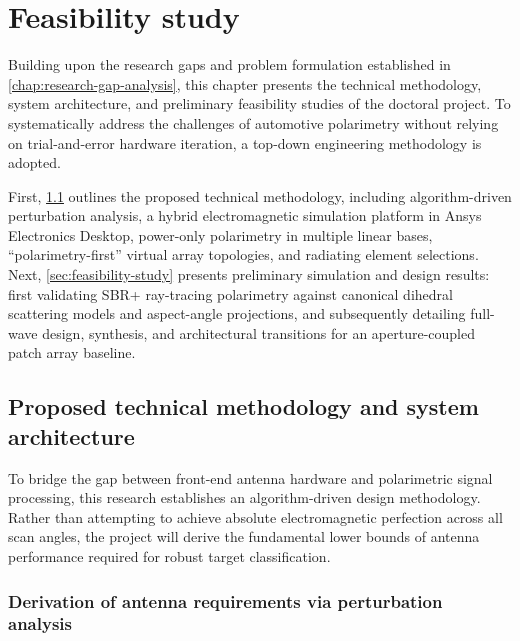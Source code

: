 \chapter{Feasibility study}
\label{chap:feasibility-study}

Building upon the research gaps and problem formulation established in \cref{chap:research-gap-analysis}, this chapter presents the technical methodology, system architecture, and preliminary feasibility studies of the doctoral project.
To systematically address the challenges of automotive polarimetry without relying on trial-and-error hardware iteration, a top-down engineering methodology is adopted.

First, \cref{sec:proposed-solutions} outlines the proposed technical methodology, including algorithm-driven perturbation analysis, a hybrid electromagnetic simulation platform in Ansys Electronics Desktop, power-only polarimetry in multiple linear bases, \enquote{polarimetry-first} virtual array topologies, and radiating element selections.
Next, \cref{sec:feasibility-study} presents preliminary simulation and design results: first validating SBR+ ray-tracing polarimetry against canonical dihedral scattering models and aspect-angle projections, and subsequently detailing full-wave design, synthesis, and architectural transitions for an aperture-coupled patch array baseline.


\section{Proposed technical methodology and system architecture}
\label{sec:proposed-solutions}

To bridge the gap between front-end antenna hardware and polarimetric signal processing, this research establishes an algorithm-driven design methodology.
Rather than attempting to achieve absolute electromagnetic perfection across all scan angles, the project will derive the fundamental lower bounds of antenna performance required for robust target classification.


\subsection{Derivation of antenna requirements via perturbation analysis}
\label{sec:perturbation-analysis}

